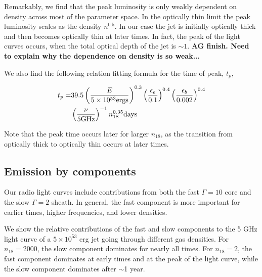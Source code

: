 \documentclass[usenatbib,fleqn]{mnras}
\begin{document}
Remarkably, we find that the peak luminosity is only weakly dependent
on density across most of the parameter space. In the optically thin
limit the peak luminosity scales as the density $n^{0.5}$. In our case
the jet is initially optically thick and then becomes optically thin
at later times. In fact, the peak of the light curves occurs, when the
total optical depth of the jet is $\sim 1$. {\bf AG finish. Need to
  explain why the dependence on density is so weak...}


We also find the following relation fitting formula for the time of
peak, $t_p$, 

\begin{align}
  t_p =& 39.5 \left(\frac{E}{5 \times 10^{53} {\rm ergs}}\right)^{0.3}   \left(\frac{\epsilon_e}{0.1}\right)^{0.4}
  \left(\frac{\epsilon_b}{0.002}\right)^{0.4}\nonumber\\
 & \left(\frac{\nu}{5 {\rm GHz}}\right)^{-1} n_{18}^{0.35}  {\rm days}
\label{eq:peakTime}
\end{align}

Note that the peak time occurs later for larger $n_{18}$, as the
transition from optically thick to optically thin occurs at later times.

\subsection{Emission by components}
Our radio light curves include contributions from both the fast
$\Gamma=10$ core and the slow $\Gamma=2$ sheath. In general, the fast
component is more important for earlier times, higher frequencies, and
lower densities. 

We show the relative contributions of the fast and slow components to
the 5 GHz light curve of a $5 \times 10^{53}$ erg jet going through
different gas densities. For $n_{18}=2000$, the slow component
dominates for nearly all times.  For $n_{18}=2$, the fast component
dominates at early times and at the peak of the light curve, while the
slow component dominates after $\sim$1 year.
\end{document}
